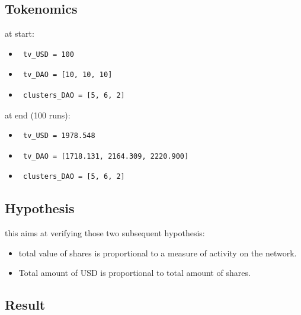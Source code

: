 \documentclass{article}
\begin{document}
\begin{multicols}{2}[]
\subsection{Tokenomics}
at start:
\begin{itemize}
	\item \begin{verbatim} tv_USD = 100 \end{verbatim}
	\item \begin{verbatim} tv_DAO = [10, 10, 10] \end{verbatim}
	\item \begin{verbatim} clusters_DAO = [5, 6, 2] \end{verbatim}
\end{itemize}
at end (100 runs):
\begin{itemize}
	\item \begin{verbatim} tv_USD = 1978.548 \end{verbatim}
	\item \begin{verbatim} tv_DAO = [1718.131, 2164.309, 2220.900] \end{verbatim}
	\item \begin{verbatim} clusters_DAO = [5, 6, 2] \end{verbatim}
\end{itemize}



\subsection{Hypothesis}
this aims at verifying those two subsequent hypothesis:
\begin{itemize}
	\item total value of shares is proportional to a measure of activity on the network.
	\item Total amount of USD is proportional to total amount of shares.
\end{itemize}

\subsection{Result}


\end{multicols}
\end{document}
